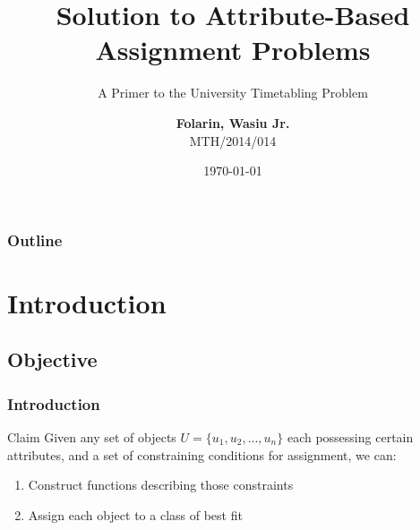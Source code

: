 \documentclass[10pt]{beamer}
\title{Solution to Attribute-Based Assignment Problems}
\subtitle{A Primer to the University Timetabling Problem}
\author{\textbf{Folarin, Wasiu Jr.}\\ MTH/2014/014}
\institute{\textbf{Dr. B. S. Ogundare}\\ \textit{Supervisor}}
\date{\today}
\begin{document}
	\begin{frame}
		\titlepage
	\end{frame}

	\begin{frame}
		\frametitle{Outline}
		\tableofcontents
	\end{frame}

	\section{Introduction}
		\subsection{Objective}
			\begin{frame}
				\frametitle{Introduction}
				\begin{block}{Claim}
					Given any set of objects $U = \{u_1, u_2,...,u_n\}$ each possessing certain attributes, and a set of constraining conditions for assignment, we can:
					\begin{enumerate}
						\item Construct functions describing those constraints
						\item Assign each object to a class of best fit
					\end{enumerate}
				\end{block}
			\end{frame}
			
\end{document}
